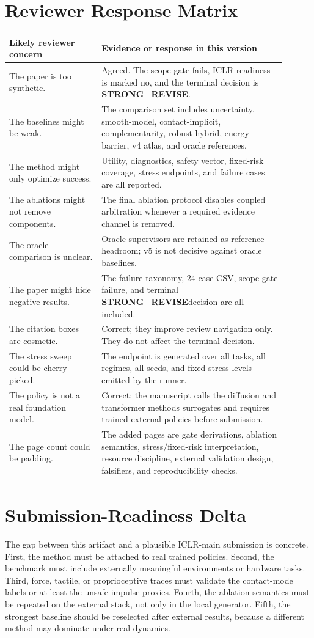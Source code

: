 \documentclass{article}
\newcommand{\terminal}{\textbf{STRONG\_REVISE}}
\begin{document}
\section{Reviewer Response Matrix}
\begin{longtable}{p{0.30\linewidth}p{0.60\linewidth}}
\toprule
Likely reviewer concern & Evidence or response in this version \\
\midrule
The paper is too synthetic. & Agreed. The scope gate fails, ICLR readiness is marked no, and the terminal decision is \terminal. \\
The baselines might be weak. & The comparison set includes uncertainty, smooth-model, contact-implicit, complementarity, robust hybrid, energy-barrier, v4 atlas, and oracle references. \\
The method might only optimize success. & Utility, diagnostics, safety vector, fixed-risk coverage, stress endpoints, and failure cases are all reported. \\
The ablations might not remove components. & The final ablation protocol disables coupled arbitration whenever a required evidence channel is removed. \\
The oracle comparison is unclear. & Oracle supervisors are retained as reference headroom; v5 is not decisive against oracle baselines. \\
The paper might hide negative results. & The failure taxonomy, 24-case CSV, scope-gate failure, and terminal \terminal decision are all included. \\
The citation boxes are cosmetic. & Correct; they improve review navigation only. They do not affect the terminal decision. \\
The stress sweep could be cherry-picked. & The endpoint is generated over all tasks, all regimes, all seeds, and fixed stress levels emitted by the runner. \\
The policy is not a real foundation model. & Correct; the manuscript calls the diffusion and transformer methods surrogates and requires trained external policies before submission. \\
The page count could be padding. & The added pages are gate derivations, ablation semantics, stress/fixed-risk interpretation, resource discipline, external validation design, falsifiers, and reproducibility checks. \\
\bottomrule
\end{longtable}

\clearpage
\section{Submission-Readiness Delta}
The gap between this artifact and a plausible ICLR-main submission is concrete. First, the method must be attached to real trained policies. Second, the benchmark must include externally meaningful environments or hardware tasks. Third, force, tactile, or proprioceptive traces must validate the contact-mode labels or at least the unsafe-impulse proxies. Fourth, the ablation semantics must be repeated on the external stack, not only in the local generator. Fifth, the strongest baseline should be reselected after external results, because a different method may dominate under real dynamics.
\end{document}
